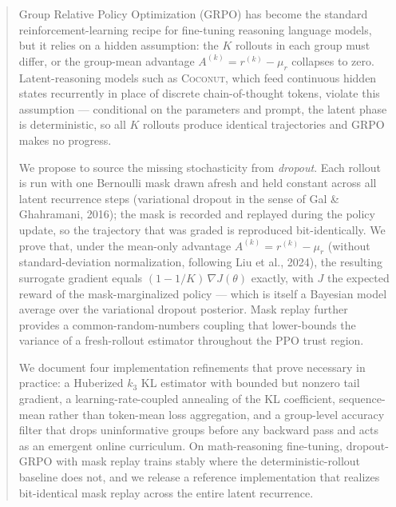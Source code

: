 
\begin{abstract}
Group Relative Policy Optimization (GRPO) has become the standard
reinforcement-learning recipe for fine-tuning reasoning language models,
but it relies on a hidden assumption: the $K$ rollouts in each group
must differ, or the group-mean advantage $A^{(k)} = r^{(k)} - \mu_r$
collapses to zero.  Latent-reasoning models such as \textsc{Coconut},
which feed continuous hidden states recurrently in place of discrete
chain-of-thought tokens, violate this assumption --- conditional on the
parameters and prompt, the latent phase is deterministic, so all $K$
rollouts produce identical trajectories and GRPO makes no progress.

We propose to source the missing stochasticity from \emph{dropout}.
Each rollout is run with one Bernoulli mask drawn afresh and held
constant across all latent recurrence steps (variational dropout in the
sense of Gal \& Ghahramani, 2016); the mask is recorded and replayed
during the policy update, so the trajectory that was graded is
reproduced bit-identically.  We prove that, under the mean-only
advantage $A^{(k)} = r^{(k)} - \mu_r$ (without standard-deviation
normalization, following Liu et al., 2024), the resulting surrogate
gradient equals $(1 - 1/K)\,\nabla J(\theta)$ exactly, with $J$ the
expected reward of the mask-marginalized policy --- which is itself a
Bayesian model average over the variational dropout posterior.  Mask
replay further provides a common-random-numbers coupling that
lower-bounds the variance of a fresh-rollout estimator throughout the
PPO trust region.

We document four implementation refinements that prove necessary in
practice: a Huberized $k_3$ KL estimator with bounded but nonzero tail
gradient, a learning-rate-coupled annealing of the KL coefficient,
sequence-mean rather than token-mean loss aggregation, and a group-level
accuracy filter that drops uninformative groups before any backward
pass and acts as an emergent online curriculum.  On math-reasoning
fine-tuning, dropout-GRPO with mask replay trains stably where the
deterministic-rollout baseline does not, and we release a reference
implementation that realizes bit-identical mask replay across the entire
latent recurrence.
\end{abstract}
